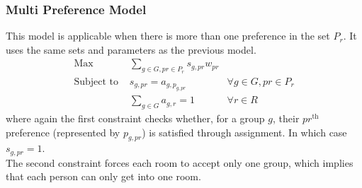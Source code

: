 \documentclass[12pt]{article}
\begin{document}
    \subsubsection*{Multi Preference Model}
    This model is applicable when there is more than one preference in the set $P_r$. It uses the same sets and parameters as the previous model.\\
    
    \begin{align*}
    \text{Max} &\sum_{g \in G, pr \in P_r} s_{g,pr}w_{pr}    \\
    \text{Subject to } &s_{g,pr} = a_{g,p_{g,pr}} &\forall g \in G, pr \in P_r\\ 
    &\sum_{g \in G} a_{g,r} = 1 &\forall r \in R
    \end{align*}
    where again the first constraint checks whether, for a group $g$, their $pr^{\text{th}}$ preference (represented by $p_{g,pr}$) is satisfied through assignment. In which case $s_{g,pr} = 1$. \\
    The second constraint forces each room to accept only one group, which implies that each person can only get into one room.
\end{document}

